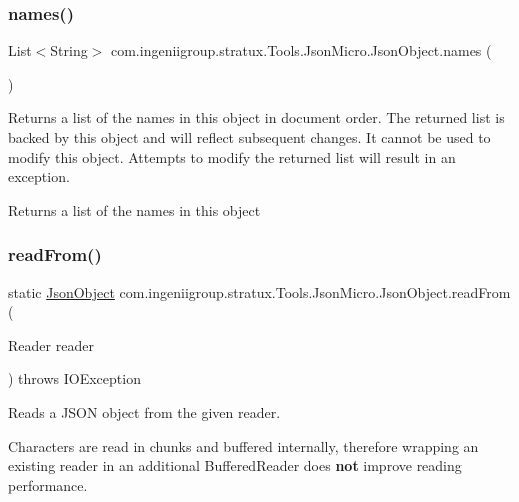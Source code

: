 \subsubsection{\texorpdfstring{names()}{names()}}
{\footnotesize\ttfamily List$<$String$>$ com.\+ingeniigroup.\+stratux.\+Tools.\+Json\+Micro.\+Json\+Object.\+names (\begin{DoxyParamCaption}{ }\end{DoxyParamCaption})}

Returns a list of the names in this object in document order. The returned list is backed by this object and will reflect subsequent changes. It cannot be used to modify this object. Attempts to modify the returned list will result in an exception.

\begin{DoxyReturn}{Returns}
a list of the names in this object 
\end{DoxyReturn}
\mbox{\label{classcom_1_1ingeniigroup_1_1stratux_1_1_tools_1_1_json_micro_1_1_json_object_a9e8230a755b00eeb6def0d2980471172}} 
\subsubsection{\texorpdfstring{read\+From()}{readFrom()}\hspace{0.1cm}{\footnotesize\ttfamily [1/2]}}
{\footnotesize\ttfamily static \hyperlink{classcom_1_1ingeniigroup_1_1stratux_1_1_tools_1_1_json_micro_1_1_json_object}{Json\+Object} com.\+ingeniigroup.\+stratux.\+Tools.\+Json\+Micro.\+Json\+Object.\+read\+From (\begin{DoxyParamCaption}\item[{Reader}]{reader }\end{DoxyParamCaption}) throws I\+O\+Exception\hspace{0.3cm}{\ttfamily [static]}}

Reads a J\+S\+ON object from the given reader. 

Characters are read in chunks and buffered internally, therefore wrapping an existing reader in an additional {\ttfamily Buffered\+Reader} does {\bfseries not} improve reading performance. 


